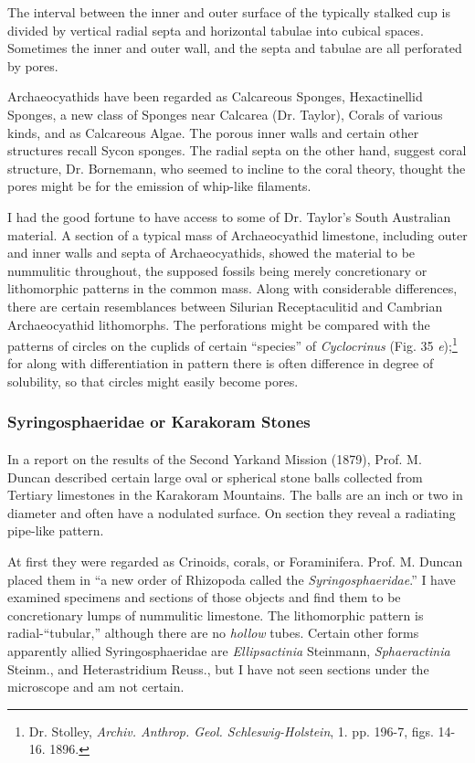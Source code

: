 \documentclass[a4paper, 12pt, oneside]{article}
\begin{document}
The interval between the inner and outer surface of the typically stalked cup is divided by vertical radial septa and horizontal tabulae into cubical spaces. Sometimes the inner and outer wall, and the septa and tabulae are all perforated by pores.

Archaeocyathids have been regarded as Calcareous Sponges, Hexactinellid Sponges, a new class of Sponges near Calcarea (Dr. Taylor), Corals of various kinds, and as Calcareous Algae. The porous inner walls and certain other structures recall Sycon sponges. The radial septa on the other hand, suggest coral structure, Dr. Bornemann, who seemed to incline to the coral theory, thought the pores might be for the emission of whip-like filaments.

I had the good fortune to have access to some of Dr. Taylor's South Australian material. A section of a typical mass of Archaeocyathid limestone, including outer and inner walls and septa of Archaeocyathids, showed the material to be nummulitic throughout, the supposed fossils being merely concretionary or lithomorphic patterns in the common mass. Along with considerable differences, there are certain resemblances between Silurian Receptaculitid and Cambrian Archaeocyathid lithomorphs. The perforations might be compared with the patterns of circles on the cuplids of certain ``species'' of \emph{Cyclocrinus} (Fig. 35 \emph{e});\footnote{Dr. Stolley, \emph{Archiv. Anthrop. Geol. Schleswig-Holstein}, 1. pp. 196-7, figs. 14-16. 1896.} for along with differentiation in pattern there is often difference in degree of solubility, so that circles might easily become pores.

\subsubsection{Syringosphaeridae or Karakoram Stones}
\paragraph{}
In a report on the results of the Second Yarkand Mission (1879), Prof. M. Duncan described certain large oval or spherical stone balls collected from Tertiary limestones in the Karakoram Mountains. The balls are an inch or two in diameter and often have a nodulated surface. On section they reveal a radiating pipe-like pattern.

At first they were regarded as Crinoids, corals, or Foraminifera. Prof. M. Duncan placed them in ``a new order of Rhizopoda called the \emph{Syringosphaeridae}.'' I have examined specimens and sections of those objects and find them to be concretionary lumps of nummulitic limestone. The lithomorphic pattern is radial-``tubular,'' although there are no \emph{hollow} tubes. Certain other forms apparently allied Syringosphaeridae are \emph{Ellipsactinia} Steinmann, \emph{Sphaeractinia} Steinm., and Heterastridium Reuss., but I have not seen sections under the microscope and am not certain.
\end{document}

